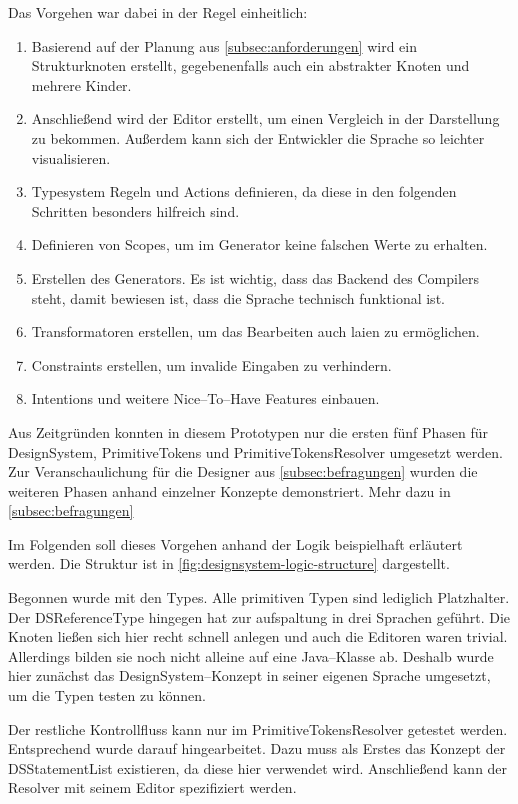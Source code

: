 Das Vorgehen war dabei in der Regel einheitlich:
\begin{enumerate}
    \item Basierend auf der Planung aus \autoref{subsec:anforderungen} wird ein Strukturknoten erstellt, gegebenenfalls auch ein abstrakter Knoten und mehrere Kinder.
    \item Anschließend wird der Editor erstellt, um einen Vergleich in der Darstellung zu bekommen.
    Außerdem kann sich der Entwickler die Sprache so leichter visualisieren.
    \item Typesystem Regeln und Actions definieren, da diese in den folgenden Schritten besonders hilfreich sind.
    \item Definieren von Scopes, um im Generator keine falschen Werte zu erhalten.
    \item Erstellen des Generators.
    Es ist wichtig, dass das Backend des Compilers steht, damit bewiesen ist, dass die Sprache technisch funktional ist.
    \item Transformatoren erstellen, um das Bearbeiten auch laien zu ermöglichen.
    \item Constraints erstellen, um invalide Eingaben zu verhindern.
    \item Intentions und weitere Nice--To--Have Features einbauen.
\end{enumerate}

Aus Zeitgründen konnten in diesem Prototypen nur die ersten fünf Phasen für DesignSystem, PrimitiveTokens und PrimitiveTokensResolver umgesetzt werden.
Zur Veranschaulichung für die Designer aus \autoref{subsec:befragungen} wurden die weiteren Phasen anhand einzelner Konzepte demonstriert.
Mehr dazu in \autoref{subsec:befragungen}

Im Folgenden soll dieses Vorgehen anhand der Logik beispielhaft erläutert werden.
Die Struktur ist in \autoref{fig:designsystem-logic-structure} dargestellt.

Begonnen wurde mit den Types.
Alle primitiven Typen sind lediglich Platzhalter.
Der {\ttfamily DSReferenceType} hingegen hat zur aufspaltung in drei Sprachen geführt.
Die Knoten ließen sich hier recht schnell anlegen und auch die Editoren waren trivial.
Allerdings bilden sie noch nicht alleine auf eine Java--Klasse ab.
Deshalb wurde hier zunächst das DesignSystem--Konzept in seiner eigenen Sprache umgesetzt, um die Typen testen zu können.

Der restliche Kontrollfluss kann nur im PrimitiveTokensResolver getestet werden.
Entsprechend wurde darauf hingearbeitet.
Dazu muss als Erstes das Konzept der {\ttfamily DSStatementList} existieren, da diese hier verwendet wird.
Anschließend kann der Resolver mit seinem Editor spezifiziert werden.


